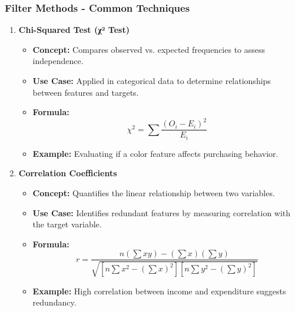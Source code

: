 \documentclass[aspectratio=169]{beamer}
\begin{document}
\begin{frame}[fragile]
    \frametitle{Filter Methods - Common Techniques}
    \begin{enumerate}
        \item \textbf{Chi-Squared Test (χ² Test)}
            \begin{itemize}
                \item \textbf{Concept:} Compares observed vs. expected frequencies to assess independence.
                \item \textbf{Use Case:} Applied in categorical data to determine relationships between features and targets.
                \item \textbf{Formula:}
                \begin{equation}
                \chi^2 = \sum \frac{(O_i - E_i)^2}{E_i}
                \end{equation}
                \item \textbf{Example:} Evaluating if a color feature affects purchasing behavior.
            \end{itemize}
        
        \item \textbf{Correlation Coefficients}
            \begin{itemize}
                \item \textbf{Concept:} Quantifies the linear relationship between two variables.
                \item \textbf{Use Case:} Identifies redundant features by measuring correlation with the target variable.
                \item \textbf{Formula:}
                \begin{equation}
                r = \frac{n(\sum xy) - (\sum x)(\sum y)}{\sqrt{[n \sum x^2 - (\sum x)^2][n \sum y^2 - (\sum y)^2]}}
                \end{equation}
                \item \textbf{Example:} High correlation between income and expenditure suggests redundancy.
            \end{itemize}
    \end{enumerate}
\end{frame}
\end{document}
